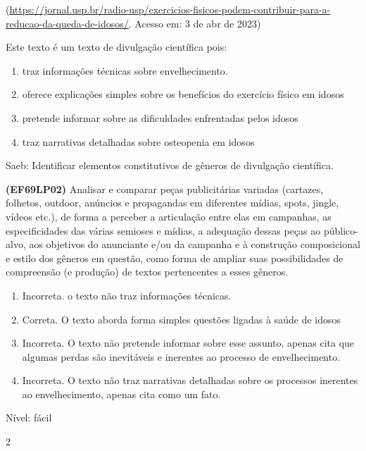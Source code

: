{(\href{https://jornal.usp.br/radio-usp/exercicios-fisicos-podem-contribuir-para-a-reducao-da-queda-de-idosos/}{\uline{https://jornal.usp.br/radio-usp/exercicios-fisicos-podem-contribuir-para-a-reducao-da-queda-de-idosos/}}.
Acesso em: 3 de abr de 2023)

Este texto é um texto de divulgação científica pois:

\begin{enumerate}
\def\labelenumi{\alph{enumi})}
\item
  traz informações técnicas sobre envelhecimento.
\item
  oferece explicações simples sobre os benefícios do exercício físico em
  idosos
\item
  pretende informar sobre as dificuldades enfrentadas pelos idosos
\item
  traz narrativas detalhadas sobre osteopenia em idosos
\end{enumerate}

Saeb: Identificar elementos constitutivos de gêneros de divulgação
científica.

\textbf{(EF69LP02)} Analisar e comparar peças publicitárias variadas
(cartazes, folhetos, outdoor, anúncios e propagandas em diferentes
mídias, spots, jingle, vídeos etc.), de forma a perceber a articulação
entre elas em campanhas, as especificidades das várias semioses e
mídias, a adequação dessas peças ao público-alvo, aos objetivos do
anunciante e/ou da campanha e à construção composicional e estilo dos
gêneros em questão, como forma de ampliar suas possibilidades de
compreensão (e produção) de textos pertencentes a esses gêneros.

\begin{enumerate}
\def\labelenumi{\arabic{enumi}.}
\item
  Incorreta. o texto não traz informações técnicas.
\item
  Correta. O texto aborda forma simples questões ligadas à saúde de
  idosos
\item
  Incorreta. O texto não pretende informar sobre esse assunto, apenas
  cita que algumas perdas são inevitáveis e inerentes ao processo de
  envelhecimento.
\item
  Incorreta. O texto não traz narrativas detalhadas sobre os processos
  inerentes ao envelhecimento, apenas cita como um fato.
\end{enumerate}

Nível: fácil

\num{2}

}
